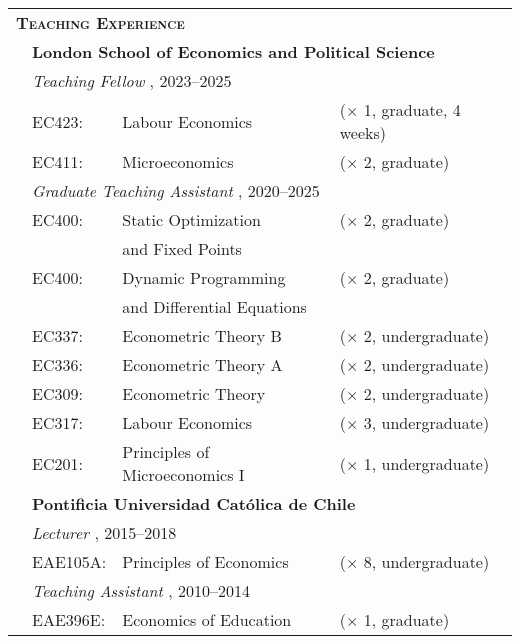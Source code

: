 \begin{tabular}{llll}
	
	\multicolumn{3}{l}{
		\large
		\textbf{%
			\textsc{%
				Teaching Experience
			}
		}
	}
	\\[2ex]
	
	\indent
	&
	\multicolumn{3}{l}{
		\textbf{%
			London School of Economics and Political Science
		}
	}
	\\[1.5ex]
	
	&
	\multicolumn{3}{l}{
		\textit{%
			Teaching Fellow%
		}%
		,
		2023--2025
	}
	\\[.5ex]
	
	& EC423:
	& Labour Economics
	& ($\times$ 1, graduate, 4 weeks)
	\\
	
	& EC411:
	& Microeconomics
	& ($\times$ 2, graduate)
	\\[1em]
	
	&
	\multicolumn{3}{l}{
		\textit{%
			Graduate Teaching Assistant%
		}%
		,
		2020--2025
	}
	\\[.5ex]
	
	& EC400:
	& Static Optimization
	& ($\times$ 2, graduate)
	\\
	
	& 
	& and Fixed Points
	& 
	\\
	
	& EC400:
	& Dynamic Programming
	& ($\times$ 2, graduate)
	\\
	& 
	& and Differential Equations
	& 
	\\
	
	& EC337:
	& Econometric Theory B
	& ($\times$ 2, undergraduate)
	\\%
	
	& EC336:
	& Econometric Theory A
	& ($\times$ 2, undergraduate)
	\\%
	
	& EC309:
	& Econometric Theory
	& ($\times$ 2, undergraduate)
	\\%
	
	& EC317:
	& Labour Economics
	& ($\times$ 3, undergraduate)
	\\%
	
	& EC201:
	& Principles of Microeconomics I
	& ($\times$ 1, undergraduate)
	\\[1em]
	
	&
	\multicolumn{3}{l}{
		\textbf{%
			Pontificia Universidad Cat\'olica de Chile
		}
	}
	\\[1.5ex]
	
	&
	\multicolumn{3}{l}{
		\textit{%
			Lecturer%
		}%
		,
		2015--2018
	}
	\\[.5ex]
	
	& EAE105A:
	& Principles of Economics
	& ($\times$ 8, undergraduate)
	\\[1em]
	
	&
	\multicolumn{3}{l}{
		\textit{%
			Teaching Assistant%
		}%
		,
		2010--2014
	}
	\\[.5ex]
	
	& EAE396E:
	& Economics of Education
	& ($\times$ 1, graduate)
	\\%

\end{tabular}

